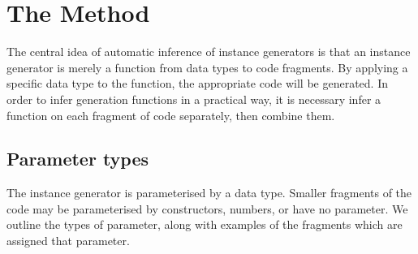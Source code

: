 \documentclass{llncs}
\begin{document}
\begin{comment}
\subsection{The Derive tool}

The Derive tool \cite{derive} is a competitor to DrIFT, designed to alleviate some of the disadvantages. The first advantage is that instance generators can added easily, without modifying the Derive tool. Secondly, by using the Template Haskell \cite{template_haskell} extension, no preprocessing phase is required. In order to integrate with Template Haskell, an instance generator takes a representation of a data type, and generates a Haskell syntax tree.

Writing an instance generator requires knowledge of the representation of both the data type, and the Haskell syntax tree. Unfortunately, the Haskell syntax tree is represented by a large data type, which takes time to learn. After writing an instance generator, the user must check that the generator matches their intention, by testing on a suitable range of data types. Both of these factors increase the time required to write an instance generator.

We have integrated automatic derivation of an instance generator, following the scheme in this paper, into the Derive tool. In order to specify a new instance generator, the user can \textit{either} specify a derivation function, \textit{or} have one automatically generated from an example.
\end{comment}

\section{The Method}
\label{sec:automatic_instances}

The central idea of automatic inference of instance generators is that an instance generator is merely a function from data types to code fragments. By applying a specific data type to the function, the appropriate code will be generated. In order to infer generation functions in a practical way, it is necessary infer a function on each fragment of code separately, then combine them.

\subsection{Parameter types}

The instance generator is parameterised by a data type. Smaller fragments of the code may be parameterised by constructors, numbers, or have no parameter. We outline the types of parameter, along with examples of the fragments which are assigned that parameter.
\end{document}
